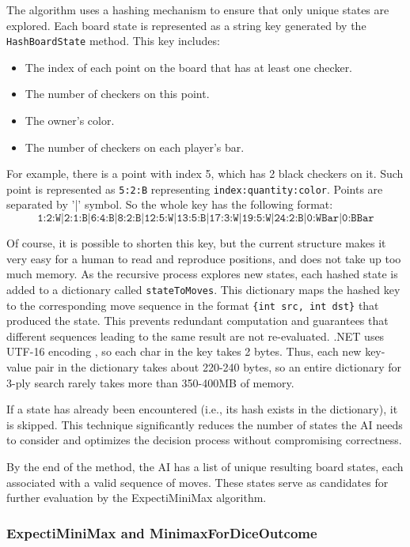 The algorithm uses a hashing mechanism to ensure that only unique states are explored. Each board state is represented as a string key generated by the \texttt{HashBoardState} method. This key includes:
\begin{itemize}
    \item The index of each point on the board that has at least one checker.
    \item The number of checkers on this point.
    \item The owner's color.
    \item The number of checkers on each player's bar.
\end{itemize}

For example, there is a point with index 5, which has 2 black checkers on it. Such point is represented as \texttt{5:2:B} representing \texttt{index:quantity:color}. Points are separated by '|' symbol. So the whole key has the following format:
$$
\texttt{1:2:W|2:1:B|6:4:B|8:2:B|12:5:W|13:5:B|17:3:W|19:5:W|24:2:B|0:WBar|0:BBar}
$$

Of course, it is possible to shorten this key, but the current structure makes it very easy for a human to read and reproduce positions, and does not take up too much memory. As the recursive process explores new states, each hashed state is added to a dictionary called \texttt{stateToMoves}. This dictionary maps the hashed key to the corresponding move sequence in the format \texttt{\{int src, int dst\}} that produced the state. This prevents redundant computation and guarantees that different sequences leading to the same result are not re-evaluated. .NET uses UTF-16 encoding \cite{microsoft_utf16}, so each char in the key takes 2 bytes. Thus, each new key-value pair in the dictionary takes about 220-240 bytes, so an entire dictionary for 3-ply search rarely takes more than 350-400MB of memory.

If a state has already been encountered (i.e., its hash exists in the dictionary), it is skipped. This technique significantly reduces the number of states the AI needs to consider and optimizes the decision process without compromising correctness.

By the end of the method, the AI has a list of unique resulting board states, each associated with a valid sequence of moves. These states serve as candidates for further evaluation by the ExpectiMiniMax algorithm.

\subsubsection{ExpectiMiniMax and MinimaxForDiceOutcome}

